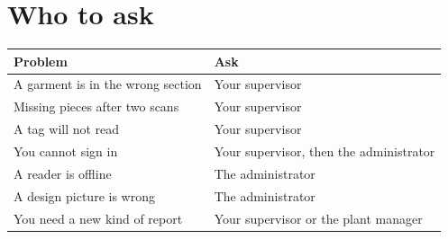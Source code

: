 \section{Who to ask}

\begin{table}[H]
\centering
\small
\begin{tabular}{@{}p{46mm}p{92mm}@{}}
\toprule
\textbf{Problem} & \textbf{Ask} \\
\midrule
A garment is in the wrong section        & Your supervisor \\
Missing pieces after two scans           & Your supervisor \\
A tag will not read                      & Your supervisor \\
You cannot sign in                       & Your supervisor, then the administrator \\
A reader is offline                      & The administrator \\
A design picture is wrong                & The administrator \\
You need a new kind of report            & Your supervisor or the plant manager \\
\bottomrule
\end{tabular}
\end{table}
